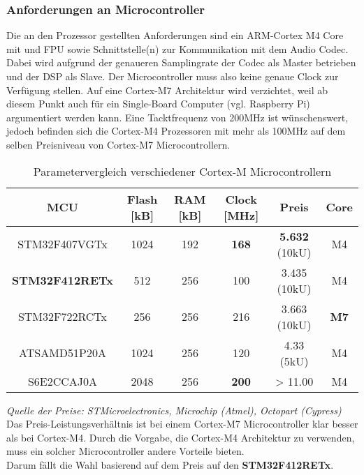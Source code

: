 \subsubsection{Anforderungen an Microcontroller}
\label{sec:Konzept_Microcontroller}

Die an den Prozessor gestellten Anforderungen sind ein ARM-Cortex M4 Core mit und FPU sowie Schnittstelle(n) zur Kommunikation mit dem Audio Codec. 
Dabei wird aufgrund der genaueren Samplingrate der Codec als Master betrieben und der DSP als Slave.
Der Microcontroller muss also keine genaue Clock zur Verfügung stellen. 
Auf eine Cortex-M7 Architektur wird verzichtet, weil ab diesem Punkt auch für ein Single-Board Computer (vgl. Raspberry Pi) argumentiert werden kann.
Eine Tacktfrequenz von 200MHz ist wünschenswert, jedoch befinden sich die Cortex-M4 Prozessoren mit mehr als 100MHz auf dem selben Preisniveau von Cortex-M7 Microcontrollern.

\begin{table}[H]
	\centering
	\begin{tabular}{|c|c|c|c|c|c|}
		\hline
		\textbf{MCU}  & \textbf{Flash {[}kB{]}} & \textbf{RAM {[}kB{]}} & \textbf{Clock {[}MHz{]}} & \textbf{Preis} & \textbf{Core} \\ \hline
		STM32F407VGTx & 1024                    & 192                   & \textbf{168}             & \textbf{5.632} (10kU) & M4            \\ \hline
		\textbf{STM32F412RETx} & 512            & 256                   & 100                      & 3.435 (10kU)        & M4            \\ \hline
		STM32F722RCTx & 256                     & 256                   & 216                      & 3.663 (10kU)        & \textbf{M7}   \\ \hline
		ATSAMD51P20A  & 1024                    & 256                   & 120                      & 4.33 (5kU)          & M4            \\
		\hline
		S6E2CCAJ0A    & 2048                    & 256                   & \textbf{200}             & > 11.00             & M4            \\
		\hline
	\end{tabular}
 	\caption{Parametervergleich verschiedener Cortex-M Microcontrollern}
 	\label{tab:ComparisonMCU}
\end{table}

\textit{Quelle der Preise: STMicroelectronics, Microchip (Atmel), Octopart (Cypress)} \\

Das Preis-Leistungsverhältnis ist bei einem Cortex-M7 Microcontroller klar besser als bei Cortex-M4. Durch die Vorgabe, die Cortex-M4 Architektur zu verwenden, muss ein solcher Microcontroller andere Vorteile bieten.\\
Darum fällt die Wahl basierend auf dem Preis auf den \textbf{STM32F412RETx}.


